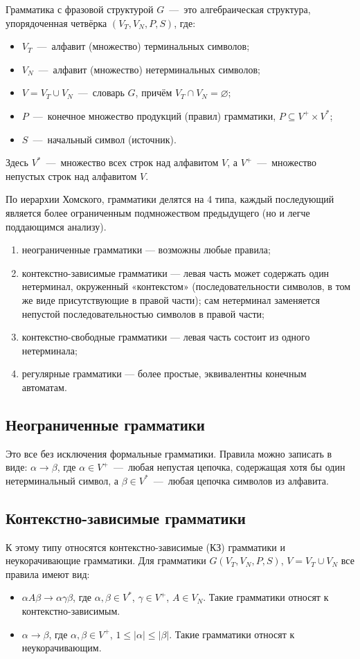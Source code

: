 Грамматика с фразовой структурой $G$~---~это алгебраическая структура, упорядоченная четвёрка $(V_T, V_N, P, S)$, где:
\begin{itemize}
 \item $V_T$~---~алфавит (множество) терминальных символов;
 \item $V_N$~---~алфавит (множество) нетерминальных символов;
 \item $V = V_T \cup V_N$~---~словарь $G$, причём $V_T \cap V_N = \varnothing$;
 \item $P$~---~конечное множество продукций (правил) грамматики, $P \subseteq V^+ \times V^*$;
 \item $S$~---~начальный символ (источник).
\end{itemize}

Здесь $V^{*}$~---~множество всех строк над алфавитом $V$, а $V^{+}$~---~множество непустых строк над алфавитом $V$.

По иерархии Хомского, грамматики делятся на 4 типа, каждый последующий является более ограниченным подмножеством предыдущего (но и легче поддающимся анализу).
\begin{enumerate}
 \item неограниченные грамматики — возможны любые правила;
 \item контекстно-зависимые грамматики — левая часть может содержать один нетерминал, окруженный «контекстом» (последовательности символов, в том же виде присутствующие в правой части); сам нетерминал заменяется непустой последовательностью символов в правой части;
 \item контекстно-свободные грамматики — левая часть состоит из одного нетерминала;
 \item регулярные грамматики — более простые, эквивалентны конечным автоматам.
\end{enumerate}

\subsection{Неограниченные грамматики}
Это все без исключения формальные грамматики. Правила можно записать в виде: $\alpha \rightarrow \beta$, 
где $\alpha \in V^{+}$~---~любая непустая цепочка, содержащая хотя бы один нетерминальный символ, 
а $\beta \in V^{*}$~---~любая цепочка символов из алфавита.

\subsection{Контекстно-зависимые грамматики}
К этому типу относятся контекстно-зависимые (КЗ) грамматики и неукорачивающие грамматики. Для грамматики 
$G(V_{T},V_{N},P,S)$, $V=V_{T}\cup V_{N}$ все правила имеют вид:
\begin{itemize}
 \item $\alpha A\beta \rightarrow \alpha \gamma \beta$, где $\alpha ,\beta \in V^{*}$, $\gamma \in V^{+}$, $A\in V_{N}$. Такие грамматики относят к контекстно-зависимым.
 \item $\alpha \rightarrow \beta$, где $\alpha ,\beta \in V^{+}$, $1\leq |\alpha |\leq |\beta |$. Такие грамматики относят к неукорачивающим.
\end{itemize}


